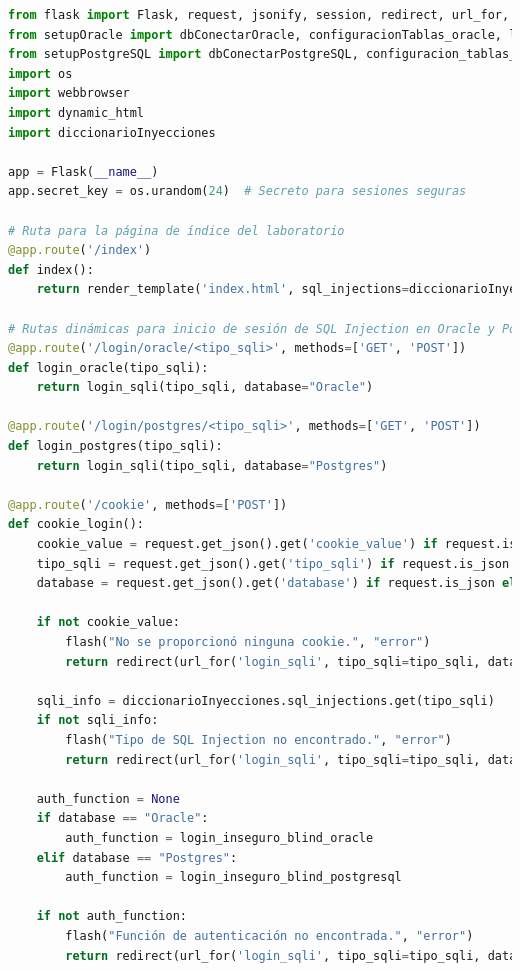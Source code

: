 \documentclass[a4paper,12pt]{article}
\begin{document}
\begin{lstlisting}[language=Python]
    from flask import Flask, request, jsonify, session, redirect, url_for, render_template, flash
from setupOracle import dbConectarOracle, configuracionTablas_oracle, login_inseguro_blind_oracle, dbDesconectar
from setupPostgreSQL import dbConectarPostgreSQL, configuracion_tablas_postgresql, login_inseguro_blind_postgresql
import os
import webbrowser
import dynamic_html
import diccionarioInyecciones

app = Flask(__name__)
app.secret_key = os.urandom(24)  # Secreto para sesiones seguras

# Ruta para la página de índice del laboratorio
@app.route('/index')
def index():
    return render_template('index.html', sql_injections=diccionarioInyecciones.sql_injections)

# Rutas dinámicas para inicio de sesión de SQL Injection en Oracle y PostgreSQL
@app.route('/login/oracle/<tipo_sqli>', methods=['GET', 'POST'])
def login_oracle(tipo_sqli):
    return login_sqli(tipo_sqli, database="Oracle")

@app.route('/login/postgres/<tipo_sqli>', methods=['GET', 'POST'])
def login_postgres(tipo_sqli):
    return login_sqli(tipo_sqli, database="Postgres")

@app.route('/cookie', methods=['POST'])
def cookie_login():
    cookie_value = request.get_json().get('cookie_value') if request.is_json else request.form.get('cookie_value')
    tipo_sqli = request.get_json().get('tipo_sqli') if request.is_json else request.form.get('tipo_sqli')
    database = request.get_json().get('database') if request.is_json else request.form.get('database')

    if not cookie_value:
        flash("No se proporcionó ninguna cookie.", "error")
        return redirect(url_for('login_sqli', tipo_sqli=tipo_sqli, database=database))

    sqli_info = diccionarioInyecciones.sql_injections.get(tipo_sqli)
    if not sqli_info:
        flash("Tipo de SQL Injection no encontrado.", "error")
        return redirect(url_for('login_sqli', tipo_sqli=tipo_sqli, database=database))

    auth_function = None
    if database == "Oracle":
        auth_function = login_inseguro_blind_oracle
    elif database == "Postgres":
        auth_function = login_inseguro_blind_postgresql

    if not auth_function:
        flash("Función de autenticación no encontrada.", "error")
        return redirect(url_for('login_sqli', tipo_sqli=tipo_sqli, database=database))


\end{lstlisting}
\end{document}
